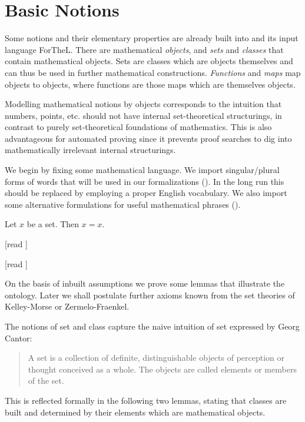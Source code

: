 \documentclass{article}
\begin{document}
\section{Basic Notions}

Some notions and their elementary properties are already
built into \Naproche{} and its input language
ForTheL. There are
mathematical {\em objects}, and {\em sets} and
{\em classes} that contain mathematical
objects. Sets are classes which are objects themselves and
can thus be used in further mathematical constructions.
{\em Functions}
and {\em maps} map objects to objects, where
functions are those
maps which are themselves objects.

Modelling mathematical notions by objects corresponds
to the intuition that numbers, points, etc. should
not have internal set-theoretical
structurings, in contrast to purely set-theoretical
foundations of mathematics. This is also advantageous
for automated proving since it prevents proof searches to
dig into mathematically irrelevant internal structurings.

We begin by fixing some mathematical language.
We import singular/plural forms of words that will be used in
our formalizations ().
In the long run this should be replaced by
employing a proper English vocabulary. We also
import some alternative formulations for
useful mathematical phrases ().

\begin{forthel}
\begin{lemma} Let $x$ be a set. Then $x=x$. \end{lemma}
  [read ]

  [read ]
\end{forthel}


On the basis of inbuilt assumptions we prove some
lemmas that illustrate the \Naproche{} ontology.
Later we shall postulate further axioms known from the
set theories of Kelley-Morse or Zermelo-Fraenkel.

The notions of set and class capture the naive intuition
of set expressed by Georg Cantor:
%
\begin{quotation}
\noindent A set is a collection of definite, distinguishable objects
of perception or thought conceived as a whole.
The objects are called elements or members of the set.
\end{quotation}
%
This is reflected formally in the following two lemmas, stating
that classes are built and determined by their
elements which are mathematical objects.
\end{document}
